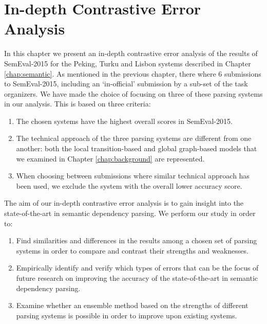 \chapter{In-depth Contrastive Error Analysis}
\label{chap:analysis}




In this chapter we present an in-depth contrastive error analysis of the results of SemEval-2015 for the Peking, Turku and Lisbon systems described in Chapter \ref{chap:semantic}. As mentioned in the previous chapter, there where 6 submissions to SemEval-2015, including an `in-official' submission by a sub-set of the task organizers. We have made the choice of focusing on three of these parsing systems in our analysis. This is based on three criteria:

\begin{enumerate}
    \item The chosen systems have the highest overall scores in SemEval-2015.
    \item The technical approach of the three parsing systems are different from one another: both the local transition-based and global graph-based models that we examined in Chapter \ref{chap:background} are represented.
    \item When choosing between submissions where similar technical approach has been used, we exclude the system with the overall lower accuracy score.
\end{enumerate}

The aim of our in-depth contrastive error analysis is to gain insight into the state-of-the-art in semantic dependency parsing. We perform our study in order to:

\begin{enumerate}
    \item Find similarities and differences in the results among a chosen set of parsing systems in order to compare and contrast their strengths and weaknesses.
    \item Empirically identify and verify which types of errors that can be the focus of future research on improving the accuracy of the state-of-the-art in semantic dependency parsing.
    \item Examine whether an ensemble method based on the strengths of different parsing systems is possible in order to improve upon existing systems.
\end{enumerate}

